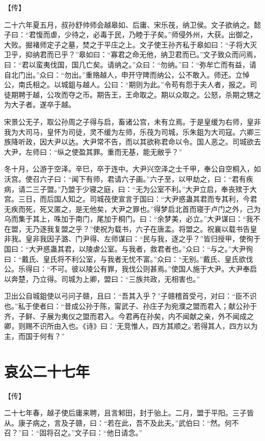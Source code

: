 \documentclass[a4paper,12pt,UTF8,twoside]{ctexbook}
\begin{document}
【传】

二十六年夏五月，叔孙舒帅师会越皋如、后庸、宋乐茷，纳卫侯。文子欲纳之。懿子曰：“君愎而虐，少待之，必毒于民，乃睦于子矣。”师侵外州，大获。出御之，大败。掘褚师定子之墓，焚之于平庄之上。文子使王孙齐私于皋如曰：“子将大灭卫乎，抑纳君而已乎？”皋如曰：“寡君之命无他，纳卫君而已。”文子致众而问焉，曰：“君以蛮夷伐国，国几亡矣。请纳之。”众曰：“勿纳。”曰：“弥牟亡而有益，请自北门出。”众曰：“勿出。”重赂越人，申开守陴而纳公，公不敢入。师还。立悼公，南氏相之。以城鉏与越人。公曰：“期则为此。”令苟有怨于夫人者，报之。司徒期聘于越，公攻而夺之币。期告王，王命取之。期以众取之。公怒，杀期之甥之为大子者。遂卒于越。

宋景公无子，取公孙周之子得与启，畜诸公宫，未有立焉。于是皇缓为右师，皇非我为大司马，皇怀为司徒，灵不缓为左师，乐茷为司城，乐朱鉏为大司寇。六卿三族降听政，因大尹以达。大尹常不告，而以其欲称君命以令。国人恶之。司城欲去大尹，左师曰：“纵之使盈其罪。重而无基，能无敝乎？”

冬十月，公游于空泽。辛巳，卒于连中。大尹兴空泽之士千甲，奉公自空桐入，如沃宫。使召六子曰：“闻下有师，君请六子画。”六子至，以甲劫之，曰：“君有疾病，请二三子盟。”乃盟于少寝之庭，曰：“无为公室不利。”大尹立启，奉丧殡于大宫。三日，而后国人知之。司城茷使宣言于国曰：“大尹惑蛊其君而专其利，今君无疾而死，死又匿之，是无他矣，大尹之罪也。”得梦启北首而寝于卢门之外，己为乌而集于其上，咮加于南门，尾加于桐门。曰：“余梦美，必立。”大尹谋曰：“我不在盟，无乃逐我复盟之乎？”使祝为载书，六子在唐盂。将盟之。祝襄以载书告皇非我。皇非我因子潞、门尹得、左师谋曰：“民与我，逐之乎？”皆归授甲，使徇于国曰：“大尹惑蛊其君，以陵虐公室。与我者，救君者也。”众曰：“与之。”大尹徇曰：“戴氏、皇氏将不利公室，与我者无忧不富。”众曰：“无别。”戴氏、皇氏欲伐公。乐得曰：“不可。彼以陵公有罪，我伐公则甚焉。”使国人施于大尹。大尹奉启以奔楚，乃立得。司城为上卿，盟曰：“三族共政，无相害也。”

卫出公自城鉏使以弓问子赣，且曰：“吾其入乎？”子赣稽首受弓，对曰：“臣不识也。”私于使者曰：“昔成公孙于陈，甯武子、孙庄子为宛濮之盟而君入；献公孙于齐，子鲜、子展为夷仪之盟而君入。今君再在孙矣，内不闻献之亲，外不闻成之卿，则赐不识所由入也。《诗》曰：‘无竞惟人，四方其顺之。’若得其人，四方以为主，而国于何有？”


\chapter{哀公二十七年}

【传】

二十七年春，越子使后庸来聘，且言邾田，封于骀上。二月，盟于平阳。三子皆从。康子病之，言及子赣，曰：“若在此，吾不及此夫。”武伯曰：“然。何不召？”曰：“固将召之。”文子曰：“他日请念。”
\end{document}
